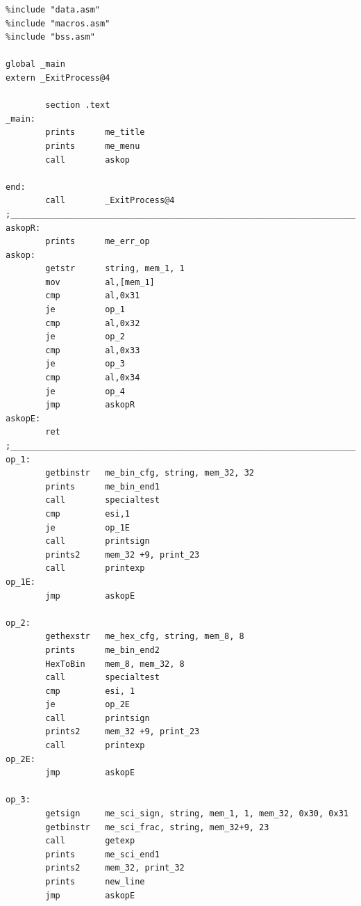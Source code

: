 \documentclass{article}
\begin{document}
	\begin{verbatim}
%include "data.asm"
%include "macros.asm"
%include "bss.asm"

global _main
extern _ExitProcess@4

        section .text
_main:
        prints      me_title
        prints      me_menu
        call        askop
        
end:
        call        _ExitProcess@4
;_______________________________________________________________________
askopR:
        prints      me_err_op
askop:
        getstr      string, mem_1, 1
        mov         al,[mem_1]
        cmp         al,0x31
        je          op_1
        cmp         al,0x32
        je          op_2
        cmp         al,0x33
        je          op_3
        cmp         al,0x34
        je          op_4
        jmp         askopR
askopE:
        ret
;_______________________________________________________________________
op_1:
        getbinstr   me_bin_cfg, string, mem_32, 32
        prints      me_bin_end1
        call        specialtest
        cmp         esi,1
        je          op_1E
        call        printsign
        prints2     mem_32 +9, print_23
        call        printexp
op_1E:
        jmp         askopE

op_2:
        gethexstr   me_hex_cfg, string, mem_8, 8
        prints      me_bin_end2
        HexToBin    mem_8, mem_32, 8
        call        specialtest
        cmp         esi, 1
        je          op_2E
        call        printsign
        prints2     mem_32 +9, print_23
        call        printexp
op_2E:
        jmp         askopE

op_3:
        getsign     me_sci_sign, string, mem_1, 1, mem_32, 0x30, 0x31
        getbinstr   me_sci_frac, string, mem_32+9, 23
        call        getexp
        prints      me_sci_end1
        prints2     mem_32, print_32
        prints      new_line
        jmp         askopE


\end{verbatim}
\end{document}
